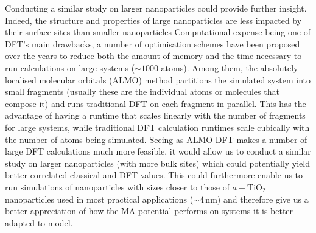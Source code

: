 \documentclass[aps,prb,twocolumn,amsmath,amssymb,superscriptaddress,longbibliography]{revtex4-1}
\newcommand\tab[1][1cm]{\hspace*{#1}} %
\begin{document}


\tab Conducting a similar study on larger nanoparticles could provide further insight.
Indeed, the structure and properties of large nanoparticles are less impacted by their surface sites than smaller nanoparticles\cite{}
Computational expense being one of DFT's main drawbacks, a number of optimisation schemes have been proposed over the years to reduce both the amount of memory and the time necessary to run calculations on large systems ($\sim 1000$ atoms).
Among them, the absolutely localised molecular orbitals\cite{almo} (ALMO) method partitions the simulated system into small fragments (usually these are the individual atoms or molecules that compose it) and runs traditional DFT on each fragment in parallel.
This has the advantage of having a runtime that scales linearly with the number of fragments for large systems, while traditional DFT calculation runtimes scale cubically with the number of atoms being simulated.
Seeing as ALMO DFT makes a number of large DFT calculations much more feasible, it would allow us to conduct a similar study on larger nanoparticles (with more bulk sites) which could potentially yield better correlated classical and DFT values.
This could furthermore enable us to run simulations of nanoparticles with sizes closer to those of $a-\text{TiO}_2$ nanoparticles used in most practical applications ($\sim 4\,$nm\cite{realistic_nnp}) and therefore give us a better appreciation of how the MA potential performs on systems it is better adapted to model.
\end{document}
